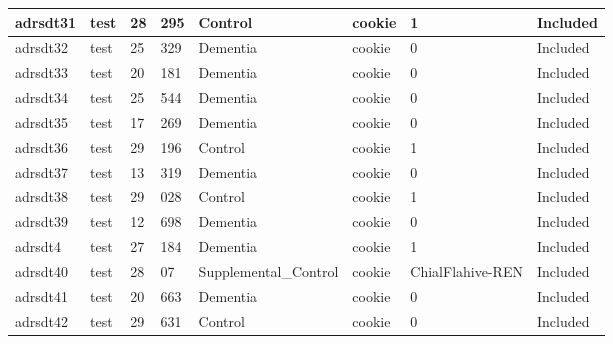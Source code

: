 \begin{center}
\begin{longtable}{|l|l|l|l|l|l|l|l|}
adrsdt31       & test                  & 28              & 295                & Control              & cookie          & 1                & Included      \\ \hline
adrsdt32       & test                  & 25              & 329                & Dementia             & cookie          & 0                & Included      \\ \hline
adrsdt33       & test                  & 20              & 181                & Dementia             & cookie          & 0                & Included      \\ \hline
adrsdt34       & test                  & 25              & 544                & Dementia             & cookie          & 0                & Included      \\ \hline
adrsdt35       & test                  & 17              & 269                & Dementia             & cookie          & 0                & Included      \\ \hline
adrsdt36       & test                  & 29              & 196                & Control              & cookie          & 1                & Included      \\ \hline
adrsdt37       & test                  & 13              & 319                & Dementia             & cookie          & 0                & Included      \\ \hline
adrsdt38       & test                  & 29              & 028                & Control              & cookie          & 1                & Included      \\ \hline
adrsdt39       & test                  & 12              & 698                & Dementia             & cookie          & 0                & Included      \\ \hline
adrsdt4        & test                  & 27              & 184                & Dementia             & cookie          & 1                & Included      \\ \hline
adrsdt40       & test                  & 28              & 07                 & Supplemental\_Control & cookie          & ChialFlahive-REN & Included      \\ \hline
adrsdt41       & test                  & 20              & 663                & Dementia             & cookie          & 0                & Included      \\ \hline
adrsdt42       & test                  & 29              & 631                & Control              & cookie          & 0                & Included      \\ \hline

\end{longtable}
\end{center}
